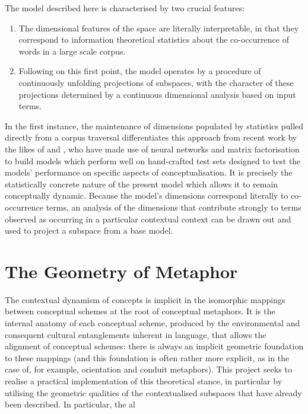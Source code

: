 The model described here is characterised by two crucial features:

\begin{enumerate}
\item The dimensional features of the space are literally interpretable, in that they correspond to information theoretical statistics about the co-occurrence of words in a large scale corpus.
\item Following on this first point, the model operates by a procedure of continuously unfolding projections of subspaces, with the character of these projections determined by a continuous dimensional analysis based on input terms.
\end{enumerate}

In the first instance, the maintenance of dimensions populated by statistics pulled directly from a corpus traversal differentiates this approach from recent work by the likes of \cite{MikolovEA2013b} and \cite{PenningtonEA2014}, who have made use of neural networks and matrix factorisation to build models which perform well on hand-crafted test sets designed to test the models' performance on specific aspects of conceptualisation.  It is precisely the statistically concrete nature of the present model which allows it to remain conceptually dynamic.  Because the model's dimensions correspond literally to co-occurrence terms, an analysis of the dimensions that contribute strongly to terms observed as occurring in a particular contextual context can be drawn out and used to project a subspace from a base model.

\section{The Geometry of Metaphor}
The contextual dynamism of concepts is implicit in the isomorphic mappings between conceptual schemes at the root of  conceptual metaphors.  It is the internal anatomy of each conceptual scheme, produced by the environmental and consequent cultural entanglements inherent in language, that allows the alignment of conceptual schemes: there is always an implicit geometric foundation to these mappings (and this foundation is often rather more explicit, as in the case of, for example, orientation and conduit metaphors).  This project seeks to realise a practical implementation of this theoretical stance, in particular by utilising the geometric qualities of the contextualised subspaces that have already been described.  In particular, the al

